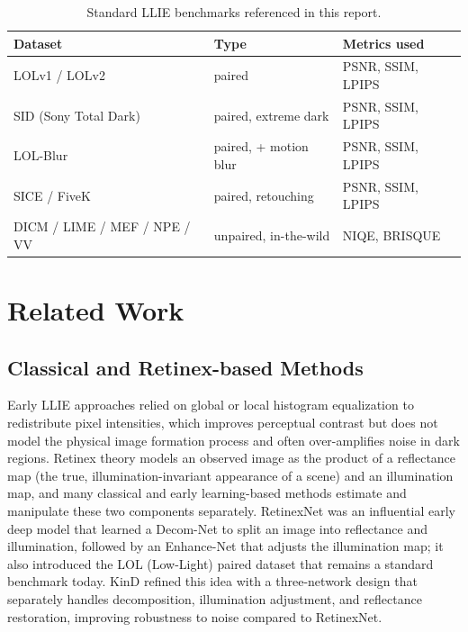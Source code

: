 \documentclass[conference]{IEEEtran}
\begin{document}
\begin{table}[t]
\centering
\caption{Standard LLIE benchmarks referenced in this report.}
\label{tab:datasets}
\begin{tabular}{lll}
\toprule
Dataset & Type & Metrics used \\
\midrule
LOLv1 / LOLv2 & paired & PSNR, SSIM, LPIPS \\
SID (Sony Total Dark) & paired, extreme dark & PSNR, SSIM, LPIPS \\
LOL-Blur & paired, + motion blur & PSNR, SSIM, LPIPS \\
SICE / FiveK & paired, retouching & PSNR, SSIM, LPIPS \\
DICM / LIME / MEF / NPE / VV & unpaired, in-the-wild & NIQE, BRISQUE \\
\bottomrule
\end{tabular}
\end{table}

\section{Related Work}
\label{sec:related}

\subsection{Classical and Retinex-based Methods}
Early LLIE approaches relied on global or local histogram equalization to
redistribute pixel intensities, which improves perceptual contrast but does
not model the physical image formation process and often over-amplifies
noise in dark regions. Retinex theory models an observed image as the
product of a reflectance map (the true, illumination-invariant appearance of
a scene) and an illumination map, and many classical and early learning-based
methods estimate and manipulate these two components separately. RetinexNet
\cite{wei2018retinexnet} was an influential early deep model that learned a
Decom-Net to split an image into reflectance and illumination, followed by an
Enhance-Net that adjusts the illumination map; it also introduced the LOL
(Low-Light) paired dataset that remains a standard benchmark today. KinD
\cite{zhang2019kindling} refined this idea with a three-network design that
separately handles decomposition, illumination adjustment, and reflectance
restoration, improving robustness to noise compared to RetinexNet.
\end{document}
